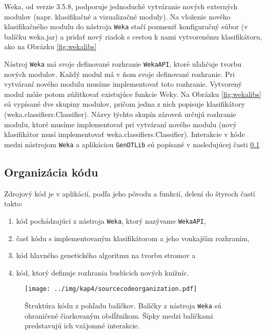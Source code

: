 Weka, od verzie 3.5.8, podporuje jednoduché vytváranie nových externých modulov (napr. klasifikačné a vizualizačné moduly). Na vloženie nového klasifikačného modulu do nástroja \verb|Weka| stačí pozmeniť konfiguračný súbor (v balíčku weka.jar) a pridať nový riadok s cestou k nami vytvorenému klasifikátoru, ako na Obrázku \ref{fig:wekalibs}

Nástroj \verb|Weka| má svoje definované rozhranie \verb|WekaAPI|, ktoré uľahčuje tvorbu nových modulov. Každý modul má v ňom svoje definované rozhranie. Pri vytváraní nového modulu musíme implementovať toto rozhranie. Vytvorený modul môže potom zúžitkovať existujúce funkcie Weky. Na Obrázku \ref{fig:wekalibs} sú vypísané dve skupiny modulov, pričom jedna z nich popisuje klasifikátory (weka.classifiers.Classifier). Názvy týchto skupín zároveň určujú rozhranie modulu, ktoré musíme implementovať pri vytváraní nového modulu (nový klasifikátor musí implementovať weka.classifiers.Classifier).
Interakcie v kóde medzi nástrojom \verb|Weka| a aplikáciou \verb|GenDTLib| sú popísané v nasledujúcej časti \ref{kap4:4.2:4.2.2:CodeOrganization}

\subsection{Organizácia kódu}\label{kap4:4.2:4.2.2:CodeOrganization}
Zdrojový kód je v aplikácií, podľa jeho pôvodu a funkcií, delení do štyroch častí takto:
\begin{enumerate}
\item kód pochádzajúci z nástroja \verb|Weka|, ktorý nazývame \verb|WekaAPI|,
\item časť kódu s implementovaným klasifikátorom a jeho vonkajším rozhraním,
\item kód hlavného genetického algoritmu na tvorbu stromov a
\item kód, ktorý definuje rozhrania budúcich nových knižníc.
\end{enumerate}

\begin{figure}[h]
\centering
\centerline{\mbox{\texttt{[image: ../img/kap4/sourcecodeorganization.pdf]}}}
\caption{Štruktúra kódu z pohľadu balíčkov. Balíčky z nástroja \texttt{Weka} sú ohraničené čiarkovaným obdĺžnikom. Šípky medzi balíčkami predstavujú ich vzájomné interakcie.}\label{fig:GenLibPackage}
\end{figure}

